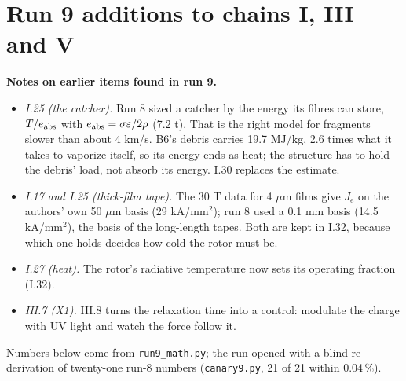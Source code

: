 \section*{Run 9 additions to chains I, III and V}
\noindent\textbf{Notes on earlier items found in run 9.}
\begin{itemize}
\item \emph{I.25 (the catcher).} Run 8 sized a catcher by the energy its fibres can store, $T/e_{\rm abs}$ with $e_{\rm abs}=\sigma\varepsilon/2\rho$
(7.2 t). That is the right model for fragments slower than about 4 km/s. B6's debris carries 19.7 MJ/kg, 2.6 times what it takes to vaporize
itself, so its energy ends as heat; the structure has to hold the debris' load, not absorb its energy. I.30 replaces the estimate.
\item \emph{I.17 and I.25 (thick-film tape).} The 30 T data for 4 $\mu$m films give $J_e$ on the authors' own 50 $\mu$m basis (29 kA/mm$^2$);
run 8 used a 0.1 mm basis (14.5 kA/mm$^2$), the basis of the long-length tapes. Both are kept in I.32, because which one holds decides how cold
the rotor must be.
\item \emph{I.27 (heat).} The rotor's radiative temperature now sets its operating fraction (I.32).
\item \emph{III.7 (X1).} III.8 turns the relaxation time into a control: modulate the charge with UV light and watch the force follow it.
\end{itemize}
Numbers below come from \texttt{run9\_math.py}; the run opened with a blind re-derivation of twenty-one run-8 numbers (\texttt{canary9.py}, 21 of 21
within 0.04\,\%).

\setcounter{section}{1}\setcounter{subsection}{29}
